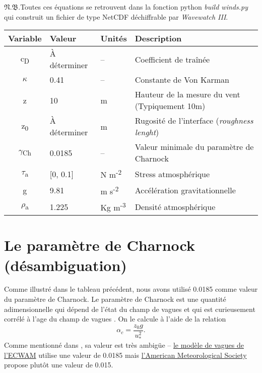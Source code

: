 \documentclass[10pt]{report}
\numberwithin{equation}{section}
\newcommand{\pt}{\hspace{1pt}} %
\newcommand{\nb}{\underline{{\footnotesize\EightStarConvex}\pt $\mathfrak{N.B.}$\vphantom{p}}\hspace{3pt}}
\begin{document}
\nb Toutes ces équations se retrouvent dans la fonction python \emph{build winds.py} qui construit un fichier de type NetCDF déchiffrable par \emph{Wavewatch III}.
\begin{center}
\begin{tabular}{clll}
Variable & Valeur & Unités & Description\\
\hline
c\textsubscript{D} & À déterminer & -- & Coefficient de traînée\\
\(\kappa\) & 0.41 & -- & Constante de Von Karman\\
z & 10 & m & Hauteur de la mesure du vent (Typiquement 10m)\\
z\textsubscript{0} & À déterminer & m & Rugosité de l'interface (\emph{roughness lenght})\\
\(\gamma\)\textsubscript{Ch} & 0.0185 & -- & Valeur minimale du paramètre de Charnock\\
\(\tau\)\textsubscript{a} & {[}0, 0.1] & N m\textsuperscript{-2} & Stress atmosphérique\\
g & 9.81 & m s\textsuperscript{-2} & Accélération gravitationnelle\\
\(\rho\)\textsubscript{a} & 1.225 & Kg m\textsuperscript{-3} & Densité atmosphérique\\
\end{tabular}
\end{center}
\section{Le paramètre de Charnock (désambiguation)}
\label{sec:org4d7e970}
Comme illustré dans le tableau précédent, nous avons utilisé 0.0185 comme valeur du paramètre de Charnock.
Le paramètre de Charnock est une quantité adimensionnelle qui dépend de l'état du champ de vagues et qui est curieusement corrélé à l'age du champ de vagues \autocite[p.60]{janssen2004interaction}.
On le calcule à l'aide de la relation
\begin{equation}
   \alpha_c = \frac{z_0 g}{u_*^2}.
\end{equation}
Comme mentionné dans \Textcite{janssen2004interaction}, sa valeur est très ambigüe -- \href{https://codes.ecmwf.int/grib/param-db/148}{le modèle de vagues de l'ECWAM} utilise une valeur de 0.0185 mais \href{https://glossary.ametsoc.org/wiki/Charnock\%27s\_relation\#:\~:text=An\%20empirical\%20expression\%20for\%20aerodynamic,due\%20to\%20increasing\%20surface\%20stress.}{l'American Meteorological Society} propose plutôt une valeur de 0.015.\bigskip
\end{document}
